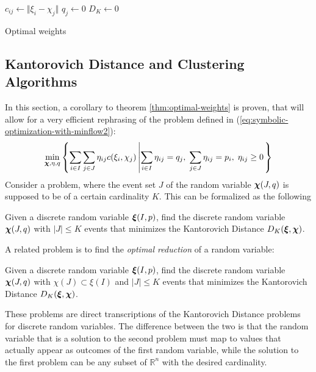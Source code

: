 \begin{algorithm}
  $c_{ij} \leftarrow \Vert \xi_i - \chi_j\Vert$
  $q_j \leftarrow 0$\;
  $D_K \leftarrow 0$\;
  \caption{Optimal weights}
  \label{alg:optimal-weights}
\end{algorithm}
\subsection{Kantorovich Distance and Clustering Algorithms}
\label{sec:kantorovich-and-clusters}
In this section, a corollary to theorem \ref{thm:optimal-weights} is proven, that will allow for a very efficient rephrasing of the problem defined in (\ref{eq:symbolic-optimization-with-minflow2}):
\[
  \min_{\boldsymbol\chi,\eta,q}\left\{\sum_{i\in I}\sum_{j\in J}\eta_{ij}c(\xi_i,\chi_j)\left|\sum_{i\in I}\eta_{ij}=q_j,\;\sum_{j\in J}\eta_{ij}=p_i,\;\eta_{ij}\geq 0\right.\right\}
\]
Consider a problem, where the event set $J$ of the random variable $\boldsymbol\chi(J,q)$ is supposed to be of a certain cardinality $K$.
This can be formalized as the following
\begin{problem}
\label{prb:CE-Kantorovich-randvar}
  Given a discrete random variable $\boldsymbol\xi(I,p)$, find the discrete random variable $\boldsymbol\chi(J,q)$ with $|J | \leq K$ events that minimizes the Kantorovich Distance $D_K(\boldsymbol\xi,\boldsymbol\chi)$.
\end{problem}
A related problem is to find the \textit{optimal reduction} of a random variable:
\begin{problem}
  \label{prb:DE-Kantorovich-randvar}
  Given a discrete random variable $\boldsymbol\xi(I,p)$, find the discrete random variable $\boldsymbol\chi(J,q)$ with $\chi(J)\subset\xi(I)$ and $|J | \leq K$ events that minimizes the Kantorovich Distance $D_K(\boldsymbol\xi,\boldsymbol\chi)$.
\end{problem}
These problems are direct transcriptions of the Kantorovich Distance problems for discrete random variables.
The difference between the two is that the random variable that is a solution to the second problem must map to values that actually appear as outcomes of the first random variable,
while the solution to the first problem can be any subset of $\mathbb{R}^n$ with the desired cardinality.

